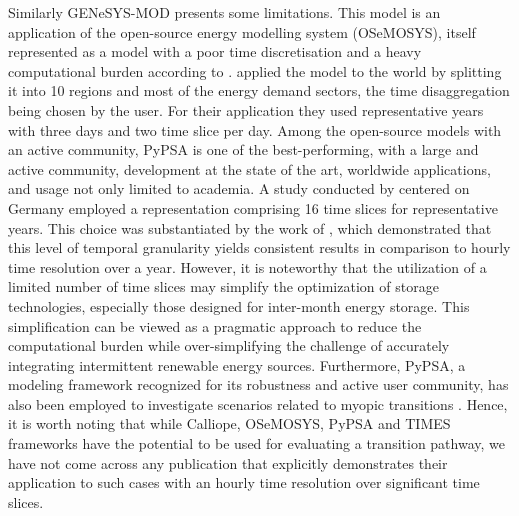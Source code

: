 Similarly GENeSYS-MOD presents some limitations. This model is an application of the open-source energy modelling system (OSeMOSYS), itself represented as a model with a poor time discretisation and a heavy computational burden according to 
\cite{prina2019transition}. \citet{loffler2017designing} applied the model to the world by splitting it into 10 regions and most of the energy demand sectors, the time disaggregation being chosen by the user. For their application they used representative years with three days and two time slice per day. 
Among the open-source models with an active community, PyPSA is one of the best-performing, with a large and active community, development at the state of the art, worldwide applications, and usage not only limited to academia. A study conducted by \citet{bartholdsen2019pathways} centered on Germany employed a representation comprising 16 time slices for representative years. This choice was substantiated by the work of \citet{welsch2014incorporating}, which demonstrated that this level of temporal granularity yields consistent results in comparison to hourly time resolution over a year. However, it is noteworthy that the utilization of a limited number of time slices may simplify the optimization of storage technologies, especially those designed for inter-month energy storage. This simplification can be viewed as a pragmatic approach to reduce the computational burden while over-simplifying the challenge of accurately integrating intermittent renewable energy sources. Furthermore, PyPSA, a modeling framework recognized for its robustness and active user community, has also been employed to investigate scenarios related to myopic transitions \cite{pedersen2022long}. 
Hence, it is worth noting that while Calliope, OSeMOSYS, PyPSA and TIMES frameworks have the potential to be used for evaluating a transition pathway, we have not come across any publication that explicitly demonstrates their application to such cases with an hourly time resolution over significant time slices. 



